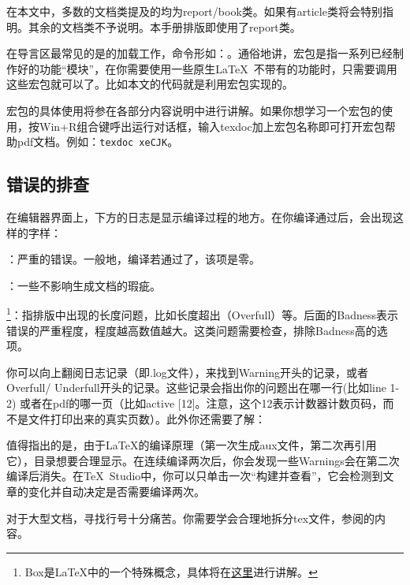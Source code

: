 在本文中，多数的文档类提及的均为report/book类。如果有article类将会特别指明。其余的文档类不予说明。本手册排版即使用了report类。\dpar

在导言区最常见的是的加载工作，命令形如：。通俗地讲，宏包是指一系列已经制作好的功能``模块''，在你需要使用一些原生\LaTeX\ 不带有的功能时，只需要调用这些宏包就可以了。比如本文的代码就是利用宏包实现的。

宏包的具体使用将参在各部分内容说明中进行讲解。如果你想学习一个宏包的使用，按Win+R组合键呼出运行对话框，输入texdoc加上宏包名称即可打开宏包帮助pdf文档。例如：\verb|texdoc xeCJK|。


\subsection{错误的排查}
\label{subsec:debug}
在编辑器界面上，下方的日志是显示编译过程的地方。在你编译通过后，会出现这样的字样：
\begin{feai}
	\item {}：严重的错误。一般地，编译若通过了，该项是零。
	\item {}：一些不影响生成文档的瑕疵。
	\item {\footnote{Box是\LaTeX{}中的一个特殊概念，具体将在\hyperref[sec:box]{这里}进行讲解。}}：指排版中出现的长度问题，比如长度超出（Overfull）等。后面的Badness表示错误的严重程度，程度越高数值越大。这类问题需要检查，排除Badness高的选项。
\end{feai}

你可以向上翻阅日志记录（即.log文件），来找到Warning开头的记录，或者Overfull/ Underfull开头的记录。这些记录会指出你的问题出在哪一行(比如line 1-2) 或者在pdf的哪一页（比如active [12]。注意，这个12表示计数器计数页码，而不是文件打印出来的真实页数）。此外你还需要了解：
\begin{feai}
	\item 值得指出的是，由于\LaTeX{}的编译原理（第一次生成aux文件，第二次再引用它），目录想要合理显示。在连续编译两次后，你会发现一些Warnings会在第二次编译后消失。在\TeX\ Studio中，你可以只单击一次“构建并查看”，它会检测到文章的变化并自动决定是否需要编译两次。
	\item 对于大型文档，寻找行号十分痛苦。你需要学会合理地拆分tex文件，参阅的内容。
\end{feai}

